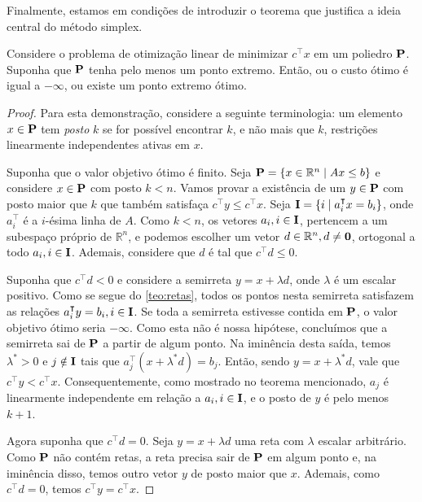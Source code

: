 Finalmente, estamos em condições de introduzir o teorema que justifica a ideia central do método simplex.

\begin{theorem}
    Considere o problema de otimização linear de minimizar $c^\intercal x$ em um poliedro $\vb P$. Suponha que $\vb P$ tenha pelo menos um ponto extremo. Então, ou o custo ótimo é igual a $-\infty$, ou existe um ponto extremo ótimo.
\end{theorem}

\begin{proof}
    Para esta demonstração, considere a seguinte terminologia: um elemento $x \in \vb P$ tem \emph{posto} $k$ se for possível encontrar $k$, e não mais que $k$, restrições linearmente independentes ativas em $x$.

    Suponha que o valor objetivo ótimo é finito. Seja $\vb P = \{x \in \mathbb{R}^n \mid Ax \leq b\}$ e considere $x \in \vb P$ com posto $k < n$. Vamos provar a existência de um $y \in \vb P$ com posto maior que $k$ que também satisfaça $c^\intercal y \leq c^\intercal x$. Seja $ \vb I = \{i\mid a_i^\intercal x = b_i\}$, onde $a_i^\intercal$ é a $i$-ésima linha de $ A$. Como $k < n$, os vetores $ a_i, i \in  \vb I$, pertencem a um subespaço próprio de $\mathbb{R}^n$, e podemos escolher um vetor $ d \in \mathbb{R}^n, d \neq \vb 0$, ortogonal a todo $ a_i, i \in  \vb I$. Ademais, considere que $ d$ é tal que $c^\intercal d \leq 0$.

    Suponha que $c^\intercal d < 0$ e considere a semirreta $y = x + \lambda  d$, onde $\lambda$ é um escalar positivo. Como se segue do \cref{teo:retas}, todos os pontos nesta semirreta satisfazem as relações ${a_i^\intercal y = b_i, i \in  \vb I}$. Se toda a semirreta estivesse contida em $\vb P$, o valor objetivo ótimo seria $-\infty$. Como esta não é nossa hipótese, concluímos que a semirreta sai de $\vb P$ a partir de algum ponto. Na iminência desta saída, temos $\lambda^* > 0$ e $j \notin  \vb I$ tais que $a_j^\intercal (x + \lambda^*d) = b_j$. Então, sendo $y = x + \lambda^* d$, vale que $c^\intercal y < c^\intercal x$. Consequentemente, como mostrado no teorema mencionado, $ a_j$ é linearmente independente em relação a $ a_i, i \in  \vb I$, e o posto de $ y$ é pelo menos $k + 1$.

    Agora suponha que $c^\intercal d = 0$. Seja $y = x + \lambda  d$ uma reta com $\lambda$ escalar arbitrário. Como $\vb P$ não contém retas, a reta precisa sair de $\vb P$ em algum ponto e, na iminência disso, temos outro vetor $ y$ de posto maior que $ x$. Ademais, como $c^\intercal d = 0$, temos $c^\intercal y = c^\intercal x$.


\end{proof}
